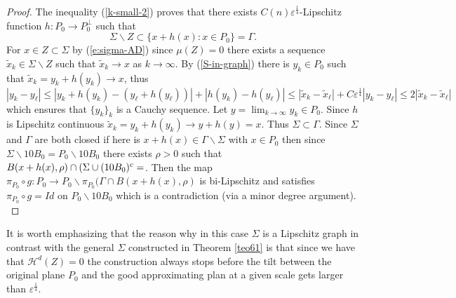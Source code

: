 \documentclass[11pt]{amsart}
\newcommand{\rf}[1]{{(\ref{#1})}}
\newcommand{\ve}{{\varepsilon}}
\theoremstyle{definition}
\theoremstyle{remark}
\numberwithin{equation}{section}
\def\cH{{\mathcal{H}}}
\def\lec{\lesssim}
\def\grad{\nabla}
\def\lec{\lesssim}
\begin{document}
\begin{proof}
{ The inequality \rf{k-small-2}
  proves that there exists $C(n)\ve^{\frac14}$-Lipschitz function $h:P_{0}\rightarrow P_{0}^{\perp}$ such that 
 \begin{equation}\label{S-in-graph}
	\Sigma \backslash Z\subset \{x+h(x):x\in P_{0}\}=\Gamma.
	\end{equation}
For $x\in Z\subset \Sigma$ by \rf{e:sigma-AD} since $\mu(Z)=0$ there exists a sequence $\tilde x_k\in \Sigma\backslash Z$ such that $\tilde x_k\to x$ as $k\to\infty$. By \rf{S-in-graph} there is $y_k\in P_0$ 
such that $\tilde x_k=y_k+h(y_k)\to x$, thus $|y_k-y_\ell|\le |y_k+h(y_k) -(y_\ell+h(y_\ell))| +|h(y_k)-h(y_\ell)|\le |\tilde x_k-\tilde x_\ell| + C\ve^{\frac{1}{4}}|y_k-y_\ell|\le 2|\tilde x_k-\tilde x_\ell|$ which ensures that $\{y_k\}_k$ is a Cauchy sequence. Let $y=\lim_{k\to\infty}y_k\in P_0$. Since $h$ is Lipschitz continuous $\tilde x_k=y_k+h(y_k)\to y+h(y)=x$. Thus $\Sigma\subset \Gamma$.
 Since $\Sigma$ and $\Gamma$ are both closed if here is $x+h(x)\in \Gamma\backslash \Sigma$ with $x\in P_0$ then since $\Sigma\backslash 10B_0=P_0\backslash 10B_0$ there exists $\rho>0$ such that 
 $B(x+h(x),\rho)\cap (\Sigma\cup (10B_0)^c=\empty$. Then the map $\pi_{P_0}\circ g:P_0\rightarrow P_0\backslash \pi_{P_0}(\Gamma \cap B(x+h(x),\rho)$ is bi-Lipschitz and satisfies $\pi_{P_0}\circ g= Id$ on
 $P_0\backslash 10B_0$ which is a contradiction (via a minor degree argument).
 }\end{proof}
 
 {%
 It is worth emphasizing that the reason why in this case $\Sigma$ is a Lipschitz graph in contrast with the general $\Sigma$ constructed in Theorem \ref{teo61} is that since we have that $\cH^d(Z)=0$ the 
 construction always stops before the tilt between the original plane $P_0$ and the good approximating plan at a given scale gets larger than $\ve^{\frac{1}{4}}$.}
 
\end{document}
